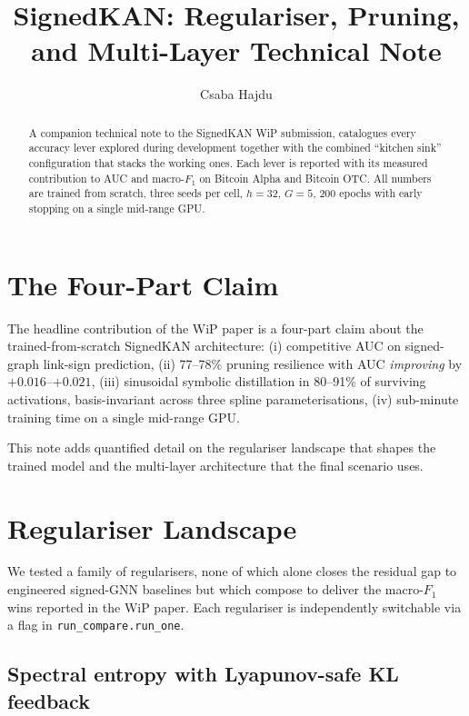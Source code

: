 \documentclass[11pt, a4paper]{article}
\title{SignedKAN: Regulariser, Pruning, and Multi-Layer Technical Note}
\author{Csaba Hajdu}
\date{}
\begin{document}
\maketitle

\begin{abstract}
A companion technical note to the SignedKAN WiP submission,
catalogues every accuracy lever explored during development
together with the combined ``kitchen sink'' configuration that
stacks the working ones. Each lever is reported with its
measured contribution to AUC and macro-$F_1$ on Bitcoin Alpha
and Bitcoin OTC. All numbers are trained from scratch, three
seeds per cell, $h\!=\!32$, $G\!=\!5$, $200$ epochs with early
stopping on a single mid-range GPU.
\end{abstract}

\section{The Four-Part Claim}

The headline contribution of the WiP paper is a four-part claim
about the trained-from-scratch SignedKAN architecture:
(i) competitive AUC on signed-graph link-sign prediction,
(ii) 77--78\% pruning resilience with AUC \emph{improving} by
$+0.016$--$+0.021$, (iii) sinusoidal symbolic distillation in
80--91\% of surviving activations, basis-invariant across three
spline parameterisations, (iv) sub-minute training time on a
single mid-range GPU.

This note adds quantified detail on the regulariser landscape that
shapes the trained model and the multi-layer architecture that the
final scenario uses.

\section{Regulariser Landscape}

We tested a family of regularisers, none of which alone closes the
residual gap to engineered signed-GNN baselines but which compose
to deliver the macro-$F_1$ wins reported in the WiP paper. Each
regulariser is independently switchable via a flag in
\texttt{run\_compare.run\_one}.

\subsection{Spectral entropy with Lyapunov-safe KL feedback}
\label{sec:reg-entropy}
\end{document}
